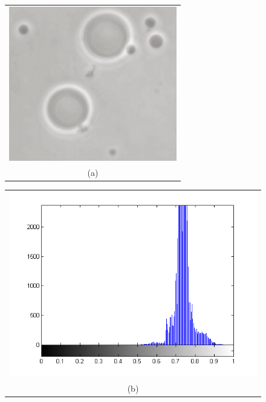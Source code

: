 \begin{figure}[h!]
\centering
\begin{minipage}{.45\textwidth}
\begin{tabular}{c}
\includegraphics[width=.9\textwidth]{backgroundTheory/segmentation/NotSegmented} \\
(a)
\end{tabular}
\end{minipage}
\begin{minipage}{.45\textwidth}
\begin{tabular}{c}
\includegraphics[width=.9\textwidth]{backgroundTheory/segmentation/NotSegmentedHist} \\
(b)
\end{tabular}

\end{minipage}
\end{figure}
